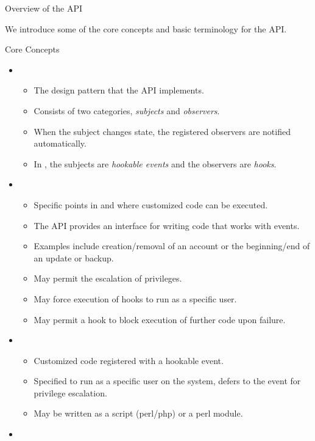 \begin{section}{Overview of the \cPanel API}
  
We introduce some of the core concepts and basic terminology for the \cPanel API.
    
  \begin{subsection}{Core Concepts}
    \begin{itemize}
    \item {}
      \begin{itemize}
      \item The design pattern that the \cPanel API implements.
      \item Consists of two categories, {\em subjects} and {\em observers}.
      \item When the subject changes state, the registered observers are notified automatically.
      \item In \cPanel, the subjects are {\em hookable events} and the observers are {\em hooks}.
      \end{itemize}
    \item {}
      \begin{itemize}
      \item Specific points in \cPanel and \WHM where customized code can be executed.
      \item The \cPanel API provides an interface for writing code that works with \cPanel events.
      \item Examples include creation/removal of an account or the beginning/end of an update or backup.
      \item May permit the escalation of privileges.
      \item May force execution of hooks to run as a specific user.
      \item May permit a hook to block execution of further \cPanel code upon failure.
      \end{itemize}
    \item {}
      \begin{itemize}
      \item Customized code registered with a hookable event.
      \item Specified to run as a specific user on the system, defers to the event for privilege escalation.
      \item May be written as a script (perl/php) or a perl module.
      \end{itemize}
    \item {}

\end{itemize}
\end{subsection}
\end{section}
